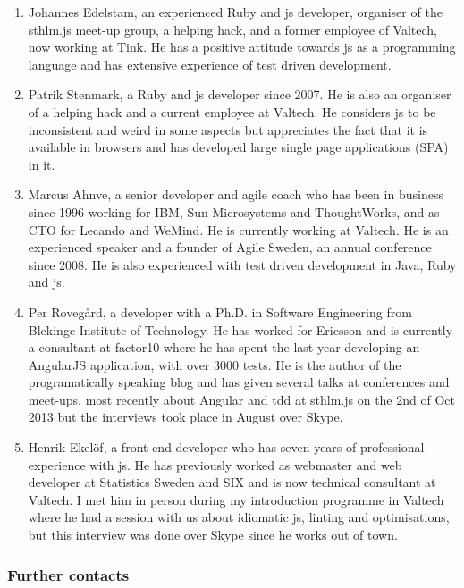 \documentclass[11pt]{article}
\begin{document}
\begin{enumerate}
\item Johannes Edelstam, an experienced Ruby and \gls{js} developer, organiser of the sthlm.js meet-up group, a helping hack, and a former employee of Valtech, now working at Tink. He has a positive attitude towards \gls{js} as a programming language and has extensive experience of test driven development.

\item Patrik Stenmark, a Ruby and \gls{js} developer since 2007. He is also an organiser of a helping hack and a current employee at Valtech. He considers \gls{js} to be inconsistent and weird in some aspects but appreciates the fact that it is available in browsers and has developed large single page applications (SPA) in it.

\item Marcus Ahnve, a senior developer and agile coach who has been in business since 1996 working for IBM, Sun Microsystems and ThoughtWorks, and as CTO for Lecando and WeMind. He is currently working at Valtech. He is an experienced speaker and a founder of Agile Sweden, an annual conference since 2008. He is also experienced with test driven development in Java, Ruby and \gls{js}.

\item Per Rovegård, a developer with a Ph.D. in Software Engineering from Blekinge Institute of Technology. He has worked for Ericsson and is currently a consultant at factor10 where he has spent the last year developing an AngularJS application, with over 3000 tests. He is the author of the programatically speaking blog and has given several talks at conferences and meet-ups, most recently about Angular and \gls{tdd} at sthlm.js on the 2nd of Oct 2013 but the interviews took place in August over Skype.

\item Henrik Ekelöf, a front-end developer who has seven years of professional experience with \gls{js}. He has previously worked as webmaster and web developer at Statistics Sweden and SIX and is now technical consultant at Valtech. I met him in person during my introduction programme in Valtech where he had a session with us about idiomatic \gls{js}, linting and optimisations, but this interview was done over Skype since he works out of town.
\end{enumerate}

\subsubsection{Further contacts}
\end{document}
